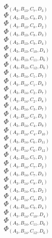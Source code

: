 \documentclass[14pt]{article}
\begin{document}
    $\Phi_{({A}_{3}, {B}_{13}, {C}_{7}, {D}_{3})}$ \\ 
    $\Phi_{({A}_{3}, {B}_{13}, {C}_{8}, {D}_{1})}$ \\ 
    $\Phi_{({A}_{3}, {B}_{13}, {C}_{8}, {D}_{2})}$ \\ 
    $\Phi_{({A}_{3}, {B}_{13}, {C}_{8}, {D}_{3})}$ \\ 
    $\Phi_{({A}_{3}, {B}_{13}, {C}_{9}, {D}_{4})}$ \\ 
    $\Phi_{({A}_{3}, {B}_{13}, {C}_{10}, {D}_{4})}$ \\ 
    $\Phi_{({A}_{3}, {B}_{13}, {C}_{11}, {D}_{6})}$ \\ 
    $\Phi_{({A}_{3}, {B}_{13}, {C}_{12}, {D}_{6})}$ \\ 
    $\Phi_{({A}_{3}, {B}_{14}, {C}_{1}, {D}_{7})}$ \\ 
    $\Phi_{({A}_{3}, {B}_{14}, {C}_{1}, {D}_{8})}$ \\ 
    $\Phi_{({A}_{3}, {B}_{14}, {C}_{2}, {D}_{7})}$ \\ 
    $\Phi_{({A}_{3}, {B}_{14}, {C}_{2}, {D}_{8})}$ \\ 
    $\Phi_{({A}_{3}, {B}_{14}, {C}_{3}, {D}_{7})}$ \\ 
    $\Phi_{({A}_{3}, {B}_{14}, {C}_{3}, {D}_{8})}$ \\ 
    $\Phi_{({A}_{3}, {B}_{14}, {C}_{4}, {D}_{9})}$ \\ 
    $\Phi_{({A}_{3}, {B}_{14}, {C}_{4}, {D}_{10})}$ \\ 
    $\Phi_{({A}_{3}, {B}_{14}, {C}_{6}, {D}_{11})}$ \\ 
    $\Phi_{({A}_{3}, {B}_{14}, {C}_{6}, {D}_{12})}$ \\ 
    $\Phi_{({A}_{3}, {B}_{14}, {C}_{7}, {D}_{1})}$ \\ 
    $\Phi_{({A}_{3}, {B}_{14}, {C}_{7}, {D}_{2})}$ \\ 
    $\Phi_{({A}_{3}, {B}_{14}, {C}_{7}, {D}_{3})}$ \\ 
    $\Phi_{({A}_{3}, {B}_{14}, {C}_{8}, {D}_{1})}$ \\ 
    $\Phi_{({A}_{3}, {B}_{14}, {C}_{8}, {D}_{2})}$ \\ 
    $\Phi_{({A}_{3}, {B}_{14}, {C}_{8}, {D}_{3})}$ \\ 
    $\Phi_{({A}_{3}, {B}_{14}, {C}_{9}, {D}_{4})}$ \\ 
    $\Phi_{({A}_{3}, {B}_{14}, {C}_{10}, {D}_{4})}$ \\ 
    $\Phi_{({A}_{3}, {B}_{14}, {C}_{11}, {D}_{6})}$ \\ 
    $\Phi_{({A}_{3}, {B}_{14}, {C}_{12}, {D}_{6})}$ \\ 
\end{document}
